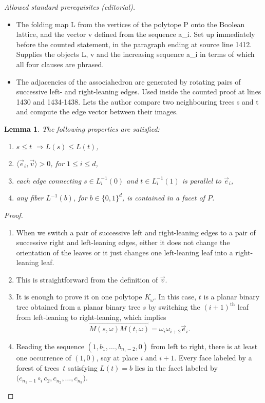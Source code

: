 \documentclass[10pt,a4paper]{amsart}
\numberwithin{equation}{section}\providecommand{\No}{}
\theoremstyle{plain}
\newtheorem{lemma}{Lemma}
\theoremstyle{definition}
\newcommand{\ang}[1]{\langle #1\rangle}
\newcommand{\Bool}[1]{\{0, 1\}^{#1}}
\begin{document}
\noindent\textit{Allowed standard prerequisites (editorial).}\begin{itemize}
\item The folding map L from the vertices of the polytope P onto the Boolean lattice, and the vector v defined from the sequence a\_i. Set up immediately before the counted statement, in the paragraph ending at source line 1412. Supplies the objects L, v and the increasing sequence a\_i in terms of which all four clauses are phrased.
\item The adjacencies of the associahedron are generated by rotating pairs of successive left- and right-leaning edges. Used inside the counted proof at lines 1430 and 1434-1438. Lets the author compare two neighbouring trees s and t and compute the edge vector between their images.
\end{itemize}\medskip
\begin{lemma}\label{lemma:propertiesofL}
The following properties are satisfied:
\begin{enumerate}
\item\label{lemma:propertiesofL1} $s\leq t$ $\Rightarrow L(s)\leq L(t)$,

\item\label{lemma:propertiesofL2} $\ang{\vec e_i, \vec v} >0$, for $1\leq i \leq d$,

\item\label{lemma:propertiesofL3} each edge connecting $s\in L^{-1}_i (0)$ and $t\in L^{-1}_i(1)$ is parallel to $\vec e_i$,

\item\label{lemma:propertiesofL4} any fiber $L^{-1}(b)$, for $b\in \Bool{d}$, is contained in a facet of $P$.
\end{enumerate}
\end{lemma}

\begin{proof}
\begin{enumerate}
\item When we switch a pair of successive left and right-leaning edges to a pair of successive right and left-leaning edges, either it does not change the orientation of the leaves or it just changes one left-leaning leaf into a right-leaning leaf.

\item This is straightforward from the definition of $\vec v$.

\item It is enough to prove it on one polytope $K_\omega$.
In this case, $t$ is a planar binary tree obtained from a planar binary tree $s$ by switching the $(i+1)^\text{th}$ leaf from left-leaning to right-leaning, which implies
\[
\overrightarrow{M(s, \omega)M(t, \omega)}=\omega_i\omega_{i+2}\vec e_i.
\]
\item Reading the sequence $(1, b_1, \ldots, b_{n_1-2}, 0)$ from left to right, there is at least one occurrence of $(1,0)$, say at place $i$ and $i+1$. Every face labeled by a forest of trees~$t$ satisfying $L(t)=b$ lies in the facet labeled by $\big(c_{n_1-1}\circ_i c_2, c_{n_2}, \ldots, c_{n_k}\big)$.\qedhere
\end{enumerate}
\end{proof}
\end{document}
